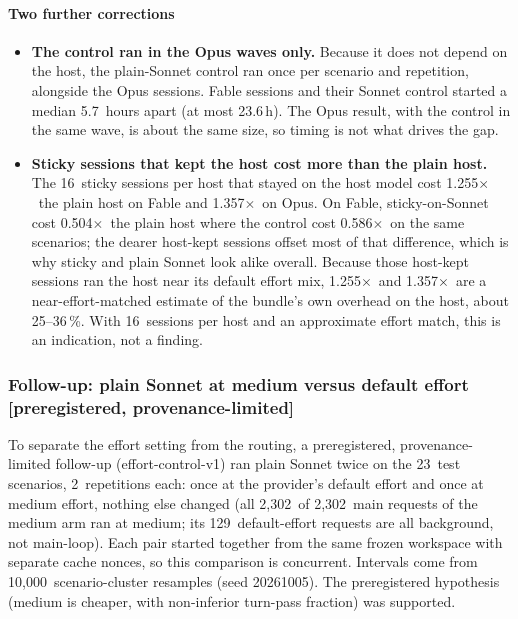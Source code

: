 \documentclass[11pt,letterpaper]{article}
\newcommand{\X}{\ensuremath{\times}}
\newcommand{\EcHE}{supported}
\newcommand{\EcReps}{2}
\newcommand{\EcResamples}{10{,}000}
\newcommand{\EcScen}{23}
\newcommand{\EcSeed}{20261005}
\newcommand{\RgEcMainMedium}{2{,}302}
\newcommand{\RgEcMainTotal}{2{,}302}
\newcommand{\RgEcNonMainDefault}{129}
\newcommand{\RgOverheadFable}{25}
\newcommand{\RgOverheadOpus}{36}
\newcommand{\RvCtlVsAnchorFable}{0.586}
\newcommand{\RvEffVsAnchorFable}{0.504}
\newcommand{\RvSonnetWaveMaxH}{23.6}
\newcommand{\RvSonnetWaveMedianH}{5.7}
\newcommand{\RvStickyHostFable}{1.255}
\newcommand{\RvStickyHostNFable}{16}
\newcommand{\RvStickyHostOpus}{1.357}
\begin{document}
\paragraph{Two further corrections}
\begin{itemize}
  \item \textbf{The control ran in the Opus waves only.} Because it does not depend on the host, the plain-Sonnet
    control ran once per scenario and repetition, alongside the Opus sessions. Fable sessions and their Sonnet
    control started a median \RvSonnetWaveMedianH\ hours apart (at most \RvSonnetWaveMaxH\,h). The Opus result,
    with the control in the same wave, is about the same size, so timing is not what drives the gap.
  \item \textbf{Sticky sessions that kept the host cost more than the plain host.} The \RvStickyHostNFable\ sticky
    sessions per host that stayed on the host model cost \RvStickyHostFable\X\ the plain host on Fable and
    \RvStickyHostOpus\X\ on Opus. On Fable, sticky-on-Sonnet cost \RvEffVsAnchorFable\X\ the plain host where the
    control cost \RvCtlVsAnchorFable\X\ on the same scenarios; the dearer host-kept sessions offset most of that
    difference, which is why sticky and plain Sonnet look alike overall. Because those host-kept sessions ran the
    host near its default effort mix, \RvStickyHostFable\X\ and \RvStickyHostOpus\X\ are a near-effort-matched estimate
    of the bundle's own overhead on the host, about \RgOverheadFable--\RgOverheadOpus\,\%. With \RvStickyHostNFable\
    sessions per host and an approximate effort match, this is an indication, not a finding.
\end{itemize}

\subsubsection{Follow-up: plain Sonnet at medium versus default effort \texorpdfstring{[preregistered, provenance-limited]}{[preregistered, provenance-limited]}}\label{vt:sec:effortfollow}

To separate the effort setting from the routing, a preregistered, provenance-limited follow-up (effort-control-v1) ran plain Sonnet
twice on the \EcScen\ test scenarios, \EcReps\ repetitions each: once at the provider's default effort and once at
medium effort, nothing else changed (all \RgEcMainMedium\ of \RgEcMainTotal\ main requests of the medium arm ran at
medium; its \RgEcNonMainDefault\ default-effort requests are all background, not main-loop). Each pair started together from the same frozen workspace with separate cache
nonces, so this comparison is concurrent. Intervals come from \EcResamples\ scenario-cluster resamples (seed
\EcSeed). The preregistered hypothesis (medium is cheaper, with non-inferior turn-pass fraction) was \EcHE.
\end{document}
